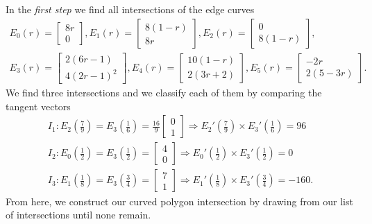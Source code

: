 \documentclass[letterpaper,10pt]{article}
\theoremstyle{definition}
\begin{document}
In the \emph{first step} we find all intersections of the
edge curves
\begin{multline}
E_0(r) = \left[ \begin{array}{c} 8 r \\ 0 \end{array}\right],
E_1(r) = \left[ \begin{array}{c} 8 (1 - r) \\ 8 r \end{array}\right],
E_2(r) = \left[ \begin{array}{c} 0 \\ 8 (1 - r) \end{array}\right], \\
E_3(r) = \left[ \begin{array}{c} 2 (6 r - 1) \\ 4 (2 r - 1)^2
  \end{array}\right],
E_4(r) = \left[ \begin{array}{c} 10 (1 - r) \\ 2 (3 r + 2) \end{array}\right],
E_5(r) = \left[ \begin{array}{c} - 2 r \\ 2 (5 - 3 r) \end{array}\right].
\end{multline}
We find three intersections
and we classify each of them by comparing the tangent vectors
\begin{gather}
  I_1:
  E_2\left(\frac{7}{9}\right) =
E_3\left(\frac{1}{6}\right) = \frac{16}{9}
\left[ \begin{array}{c} 0 \\ 1 \end{array}\right] \Longrightarrow
E_2'\left(\frac{7}{9}\right) \times
E_3'\left(\frac{1}{6}\right) = 96 \\
I_2:
E_0\left(\frac{1}{2}\right) =
E_3\left(\frac{1}{2}\right) =
\left[ \begin{array}{c} 4 \\ 0 \end{array}\right] \Longrightarrow
E_0'\left(\frac{1}{2}\right) \times
E_3'\left(\frac{1}{2}\right) = 0 \\
  I_3:
E_1\left(\frac{1}{8}\right) =
E_3\left(\frac{3}{4}\right) =
\left[ \begin{array}{c} 7 \\ 1 \end{array}\right] \Longrightarrow
E_1'\left(\frac{1}{8}\right) \times
E_3'\left(\frac{3}{4}\right) = -160.
\end{gather}
From here, we construct our curved polygon intersection by drawing
from our list of intersections until none remain.
\end{document}
